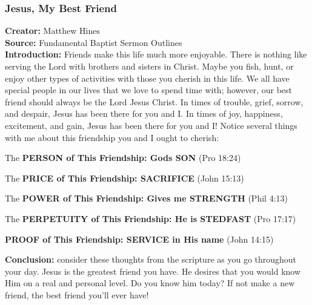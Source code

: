 \subsubsection{Jesus, My Best Friend}
\textbf{Creator: }Matthew Hines\\ 
\textbf{Source: }Fundamental Baptist Sermon Outlines\\ 
\textbf{Introduction: } Friends make this life much more enjoyable. There is nothing like serving the Lord with brothers and sisters in Christ. Maybe you fish, hunt, or enjoy other types of activities with those you cherish in this life. We all have special people in our lives that we love to spend time with; however, our best friend should always be the Lord Jesus Christ. In times of trouble, grief, sorrow, and despair, Jesus has been there for you and I. In times of joy, happiness, excitement, and gain, Jesus has been there for you and I!
Notice several things with me about this friendship you and I ought to cherish:
\begin{compactenum}[I.]
    \item The \textbf{PERSON of This Friendship: Gods SON}  (Pro 18:24)
    \item The \textbf{PRICE of This Friendship: SACRIFICE}  (John 15:13)
    \item The \textbf{POWER of This Friendship: Gives me STRENGTH}  (Phil 4:13)
    \item The \textbf{PERPETUITY of This Friendship: He is STEDFAST}  (Pro 17:17)
    \item  \textbf{PROOF of This Friendship: SERVICE in His name}  (John 14:15)
    \end{compactenum}
\textbf{Conclusion: } consider these thoughts from the scripture as you go throughout your day. Jesus is the greatest friend you have. He desires that you would know Him on a real and personal level. Do you know him today? If not make a new friend, the best friend you'll ever have!

